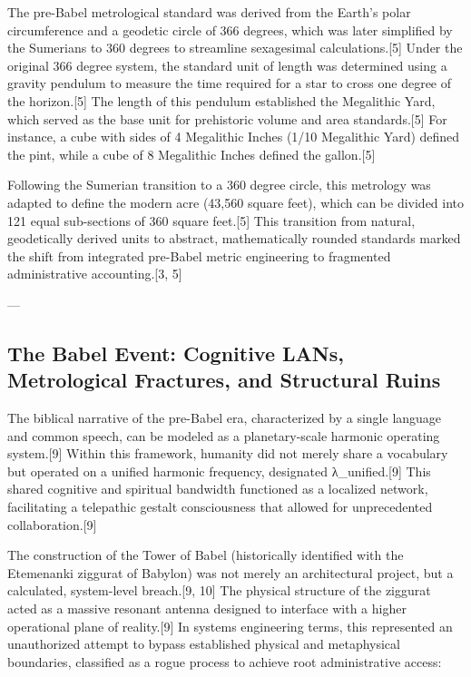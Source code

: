 \documentclass[aps,prd,11pt,onecolumn,superscriptaddress,nofootinbib,floatfix]{revtex4-2}
\begin{document}
The pre-Babel metrological standard was derived from the Earth's polar circumference and a geodetic circle of 366 degrees, which was later simplified by the Sumerians to 360 degrees to streamline sexagesimal calculations.[5] Under the original 366 degree system, the standard unit of length was determined using a gravity pendulum to measure the time required for a star to cross one degree of the horizon.[5] The length of this pendulum established the Megalithic Yard, which served as the base unit for prehistoric volume and area standards.[5] For instance, a cube with sides of 4 Megalithic Inches (1/10 Megalithic Yard) defined the pint, while a cube of 8 Megalithic Inches defined the gallon.[5]


Following the Sumerian transition to a 360 degree circle, this metrology was adapted to define the modern acre (43,560 square feet), which can be divided into 121 equal sub-sections of 360 square feet.[5] This transition from natural, geodetically derived units to abstract, mathematically rounded standards marked the shift from integrated pre-Babel metric engineering to fragmented administrative accounting.[3, 5]


---


\subsection{The Babel Event: Cognitive LANs, Metrological Fractures, and Structural Ruins}
The biblical narrative of the pre-Babel era, characterized by a single language and common speech, can be modeled as a planetary-scale harmonic operating system.[9] Within this framework, humanity did not merely share a vocabulary but operated on a unified harmonic frequency, designated λ\_unified.[9] This shared cognitive and spiritual bandwidth functioned as a localized network, facilitating a telepathic gestalt consciousness that allowed for unprecedented collaboration.[9]


The construction of the Tower of Babel (historically identified with the Etemenanki ziggurat of Babylon) was not merely an architectural project, but a calculated, system-level breach.[9, 10] The physical structure of the ziggurat acted as a massive resonant antenna designed to interface with a higher operational plane of reality.[9] In systems engineering terms, this represented an unauthorized attempt to bypass established physical and metaphysical boundaries, classified as a rogue process to achieve root administrative access:
\end{document}
